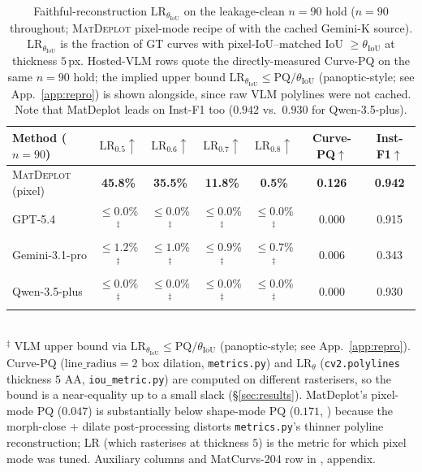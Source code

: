 \documentclass{article}
\begin{document}
\begin{table}[h]
\centering
\caption{Faithful-reconstruction $\mathrm{LR}_{\theta_{\mathrm{IoU}}}$
on the leakage-clean $n{=}90$ hold ($n{=}90$ throughout;
\textsc{MatDeplot} pixel-mode recipe of  with
the cached Gemini-K source). $\mathrm{LR}_{\theta_{\mathrm{IoU}}}$
is the fraction of GT curves with pixel-IoU--matched IoU
$\ge\theta_{\mathrm{IoU}}$ at thickness $5$\,px. Hosted-VLM rows
quote the directly-measured Curve-PQ on the same $n{=}90$ hold;
the implied upper bound
$\mathrm{LR}_{\theta_{\mathrm{IoU}}}\!\le\!\mathrm{PQ}/\theta_{\mathrm{IoU}}$
(panoptic-style; see App.~\ref{app:repro}) is shown alongside, since raw VLM polylines were
not cached. Note that MatDeplot leads on Inst-F1 too
($0.942$ vs.\ $0.930$ for Qwen-3.5-plus).}
\label{tab:iou-headline}
\small
\setlength{\tabcolsep}{4pt}
\begin{tabular}{lcccccc}
\toprule
Method ($n{=}90$) &
$\mathrm{LR}_{0.5}\uparrow$ &
$\mathrm{LR}_{0.6}\uparrow$ &
$\mathrm{LR}_{0.7}\uparrow$ &
$\mathrm{LR}_{0.8}\uparrow$ &
Curve-PQ$\uparrow$ &
Inst-F1$\uparrow$ \\
\midrule
\textsc{MatDeplot} (pixel) & \textbf{45.8\%} & \textbf{35.5\%} & \textbf{11.8\%} & \textbf{0.5\%} & \textbf{0.126} & \textbf{0.942} \\
GPT-5.4            & $\le 0.0$\%$^\ddagger$ & $\le 0.0$\%$^\ddagger$ & $\le 0.0$\%$^\ddagger$ & $\le 0.0$\%$^\ddagger$ & 0.000 & 0.915 \\
Gemini-3.1-pro     & $\le 1.2$\%$^\ddagger$ & $\le 1.0$\%$^\ddagger$ & $\le 0.9$\%$^\ddagger$ & $\le 0.7$\%$^\ddagger$ & 0.006 & 0.343 \\
Qwen-3.5-plus      & $\le 0.0$\%$^\ddagger$ & $\le 0.0$\%$^\ddagger$ & $\le 0.0$\%$^\ddagger$ & $\le 0.0$\%$^\ddagger$ & 0.000 & 0.930 \\
\bottomrule
\end{tabular}\\
\footnotesize{$^\ddagger$ VLM upper bound via
$\mathrm{LR}_{\theta_{\mathrm{IoU}}}\le \mathrm{PQ}/\theta_{\mathrm{IoU}}$
(panoptic-style; see App.~\ref{app:repro}). Curve-PQ ($\mathrm{line\_radius}{=}2$ box dilation,
\texttt{metrics.py}) and $\mathrm{LR}_{\theta}$
(\texttt{cv2.polylines} thickness $5$ AA, \texttt{iou\_metric.py})
are computed on different rasterisers, so the bound is a
near-equality up to a small slack
(\S\ref{sec:results}). MatDeplot's pixel-mode PQ ($0.047$) is
substantially below shape-mode PQ ($0.171$, )
because the morph-close + dilate post-processing distorts
\texttt{metrics.py}'s thinner polyline reconstruction; LR (which
rasterises at thickness $5$) is the metric for which pixel mode
was tuned. Auxiliary columns and MatCurvs-204 row in
, appendix.}
\end{table}
\end{document}
